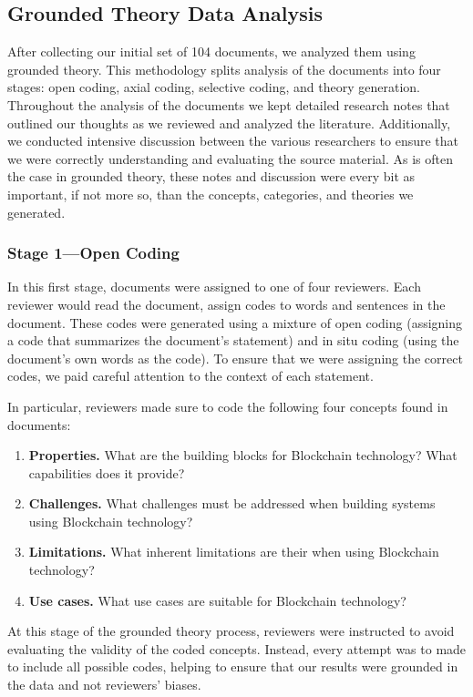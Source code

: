\subsection{Grounded Theory Data Analysis}
After collecting our initial set of 104 documents, we analyzed them using grounded theory.
This methodology splits analysis of the documents into four stages: open coding, axial coding, selective coding, and theory generation.
Throughout the analysis of the documents we kept detailed research notes that outlined our thoughts as we reviewed and analyzed the literature.
Additionally, we conducted intensive discussion between the various researchers to ensure that we were correctly understanding and evaluating the source material.
As is often the case in grounded theory, these notes and discussion were every bit as important, if not more so, than the concepts, categories, and theories we generated.

\subsubsection{Stage 1---Open Coding}
In this first stage, documents were assigned to one of four reviewers.
Each reviewer would read the document, assign codes to words and sentences in the document.
These codes were generated using a mixture of open coding (assigning a code that summarizes the document's statement) and in situ coding (using the document's own words as the code).
To ensure that we were assigning the correct codes, we paid careful attention to the context of each statement.

In particular, reviewers made sure to code the following four concepts found in documents:
\begin{enumerate}
	\item \textbf{Properties.} What are the building blocks for Blockchain technology? What capabilities does it provide?
	\item \textbf{Challenges.} What challenges must be addressed when building systems using Blockchain technology?
	\item \textbf{Limitations.} What inherent limitations are their when using Blockchain technology?
	\item \textbf{Use cases.} What use cases are suitable for Blockchain technology?
\end{enumerate}

At this stage of the grounded theory process, reviewers were instructed to avoid evaluating the validity of the coded concepts.
Instead, every attempt was to made to include all possible codes, helping to ensure that our results were grounded in the data and not reviewers' biases.

